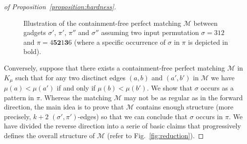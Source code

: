 \begin{proof}[of Proposition~\ref{proposition:hardness}]
\begin{figure}[t!]
\begin{tikzpicture}
        \end{tikzpicture}
        \caption{\label{fig:subfig:sigma' - pi' - pi'' - sigma''}%
        Illustration of the containment-free perfect matching $\mathcal{M}$
        between gadgets $\sigma'$, $\pi'$, $\pi''$ and $\sigma''$ assuming two
        input permutation $\sigma = 312$ and $\pi = 4\mathbf{5}\mathbf{2}1\mathbf{3}6$
        (where a specific occurrence of $\sigma$ in $\pi$ is depicted in bold).
        }
      \end{figure}

  Conversely, suppose that there exists a containment-free perfect matching
  $\mathcal{M}$ in $K_\mu$ such that for any two disctinct edges
  $(a, b)$ and $(a', b')$ in $\mathcal{M}$
  we have $\mu(a) < \mu(a')$ if and only if $\mu(b) < \mu(b')$.
  We show that $\sigma$ occurs as a pattern in $\pi$.
  Whereas the matching $\mathcal{M}$ may not be as regular as in the forward
  direction, the main idea is to prove that $\mathcal{M}$ contains enough structure
  (more precisely, $k+2$ $(\sigma', \pi')$-edges) so that we can conclude
  that $\sigma$ occurs in $\pi$.
  We have divided the reverse direction into a serie of basic claims that
  progressively defines the overall structure of $\mathcal{M}$
  (refer to Fig.~\ref{fig:reduction}).


\end{proof}
